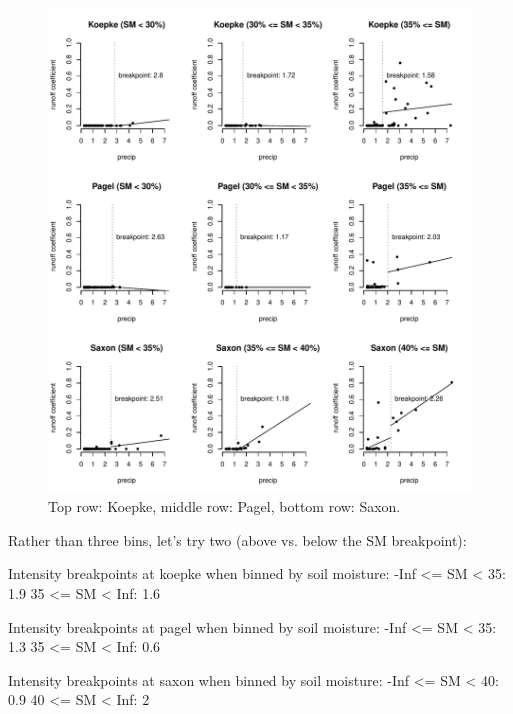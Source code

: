 \documentclass[12pt]{article}
\begin{document}
\begin{figure}
    \begin{center}
\includegraphics{runoff-precip_binned}
    \end{center}
    \caption{Top row: Koepke, middle row: Pagel, bottom row: Saxon.\label{precip_binned}}
\end{figure}


Rather than three bins, let's try two (above vs. below the SM breakpoint):\\


\begin{Schunk}
\begin{Soutput}
Intensity breakpoints at koepke when binned by soil moisture:
-Inf <= SM < 35: 1.9
35 <= SM < Inf: 1.6

Intensity breakpoints at pagel when binned by soil moisture:
-Inf <= SM < 35: 1.3
35 <= SM < Inf: 0.6

Intensity breakpoints at saxon when binned by soil moisture:
-Inf <= SM < 40: 0.9
40 <= SM < Inf: 2
\end{Soutput}
\end{Schunk}
\end{document}
